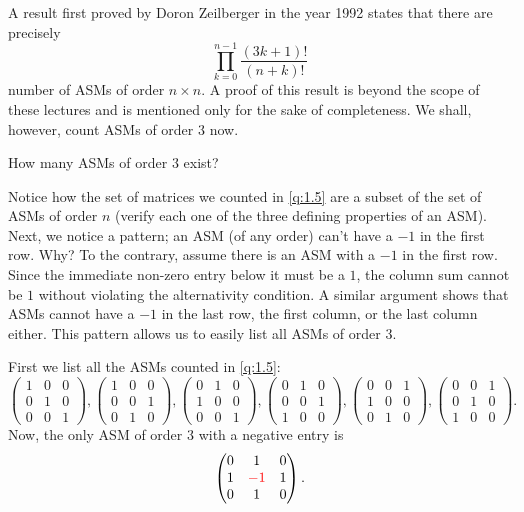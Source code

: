 A result first proved by Doron Zeilberger in the year 1992 states that there are precisely  \[
\prod_{k=0}^{n-1} \frac{\left( 3k+1 \right)!}{\left( n+k \right)!}
\] 
number of ASMs of order $n\times n$. A proof of this result is beyond the scope of these lectures and is mentioned only for the sake of completeness. We shall, however, count ASMs of order $3$ now.

\begin{question}
    How many ASMs of order $3$ exist?
    \label{q:1.6}
\end{question}
Notice how the set of matrices we counted in \cref{q:1.5} are a subset of the set of ASMs of order $n$ (verify each one of the three defining properties of an ASM). Next, we notice a pattern; an ASM (of any order) can't have a $-1$ in the first row. Why? To the contrary, assume there is an ASM with a $-1$ in the first row. Since the immediate non-zero entry below it must be a $1$, the column sum cannot be $1$ without violating the alternativity condition. A similar argument shows that ASMs cannot have a 
$-1$ in the last row, the first column, or the last column either. This pattern allows us to easily list all ASMs of order $3$.

First we list all the ASMs counted in \cref{q:1.5}:
\[
\begin{pmatrix}
    1 & 0 & 0 \\
    0 & 1 & 0 \\
    0 & 0 & 1
\end{pmatrix},
\begin{pmatrix}
    1 & 0 & 0 \\
    0 & 0 & 1 \\
    0 & 1 & 0
\end{pmatrix},
\begin{pmatrix}
    0 & 1 & 0 \\
    1 & 0 & 0 \\
    0 & 0 & 1
\end{pmatrix},
\begin{pmatrix}
    0 & 1 & 0 \\
    0 & 0 & 1 \\
    1 & 0 & 0
\end{pmatrix},
\begin{pmatrix}
    0 & 0 & 1 \\
    1 & 0 & 0 \\
    0 & 1 & 0
\end{pmatrix},
\begin{pmatrix}
    0 & 0 & 1 \\
    0 & 1 & 0 \\
    1 & 0 & 0
\end{pmatrix}.
\]
Now, the only ASM of order $3$ with a negative entry is
\[
\begin{pmatrix}
    0 & 1 & 0 \\
    1 & \textcolor{red}{-1} & 1 \\
    0 & 1 & 0
\end{pmatrix}.
\]


